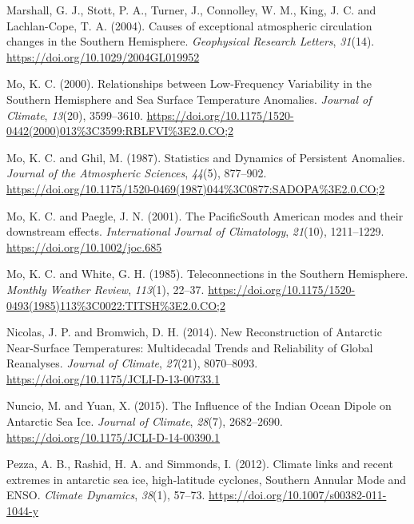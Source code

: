 \documentclass[12pt,oneside,a4paper]{reedthesis}
\newlength{\cslhangindent}
\newenvironment{CSLReferences}[2] %
 {%
  \setlength{\parindent}{0pt}
  \ifodd #1 \everypar{\setlength{\hangindent}{\cslhangindent}}\ignorespaces\fi
  \ifnum #2 > 0
  \setlength{\parskip}{#2\baselineskip}
  \fi
 }%
 {}
\begin{document}
\begin{CSLReferences}{1}{0}
\leavevmode{}%
Marshall, G. J., Stott, P. A., Turner, J., Connolley, W. M., King, J. C. and Lachlan-Cope, T. A. (2004). Causes of exceptional atmospheric circulation changes in the {Southern Hemisphere}. \emph{Geophysical Research Letters}, \emph{31}(14). \url{https://doi.org/10.1029/2004GL019952}

\leavevmode{}%
Mo, K. C. (2000). Relationships between {Low-Frequency Variability} in the {Southern Hemisphere} and {Sea Surface Temperature Anomalies}. \emph{Journal of Climate}, \emph{13}(20), 3599--3610. \url{https://doi.org/10.1175/1520-0442(2000)013\%3C3599:RBLFVI\%3E2.0.CO;2}

\leavevmode{}%
Mo, K. C. and Ghil, M. (1987). Statistics and {Dynamics} of {Persistent Anomalies}. \emph{Journal of the Atmospheric Sciences}, \emph{44}(5), 877--902. \url{https://doi.org/10.1175/1520-0469(1987)044\%3C0877:SADOPA\%3E2.0.CO;2}

\leavevmode{}%
Mo, K. C. and Paegle, J. N. (2001). The {Pacific}{\textendash}{South American} modes and their downstream effects. \emph{International Journal of Climatology}, \emph{21}(10), 1211--1229. \url{https://doi.org/10.1002/joc.685}

\leavevmode{}%
Mo, K. C. and White, G. H. (1985). Teleconnections in the {Southern Hemisphere}. \emph{Monthly Weather Review}, \emph{113}(1), 22--37. \url{https://doi.org/10.1175/1520-0493(1985)113\%3C0022:TITSH\%3E2.0.CO;2}

\leavevmode{}%
Nicolas, J. P. and Bromwich, D. H. (2014). New {Reconstruction} of {Antarctic Near-Surface Temperatures}: {Multidecadal Trends} and {Reliability} of {Global Reanalyses}. \emph{Journal of Climate}, \emph{27}(21), 8070--8093. \url{https://doi.org/10.1175/JCLI-D-13-00733.1}

\leavevmode{}%
Nuncio, M. and Yuan, X. (2015). The {Influence} of the {Indian Ocean Dipole} on {Antarctic Sea Ice}. \emph{Journal of Climate}, \emph{28}(7), 2682--2690. \url{https://doi.org/10.1175/JCLI-D-14-00390.1}

\leavevmode{}%
Pezza, A. B., Rashid, H. A. and Simmonds, I. (2012). Climate links and recent extremes in antarctic sea ice, high-latitude cyclones, {Southern Annular Mode} and {ENSO}. \emph{Climate Dynamics}, \emph{38}(1), 57--73. \url{https://doi.org/10.1007/s00382-011-1044-y}


\end{CSLReferences}
\end{document}
